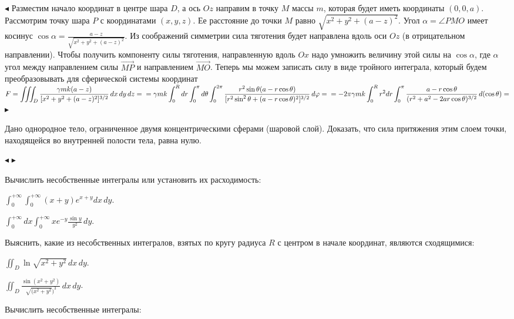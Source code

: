 \documentclass[a5paper,10pt]{article}
\begin{document}
\smallskip\noindent
$\blacktriangleleft$ Разместим начало координат в центре шара $D$, а ось $Oz$ направим в точку $M$
массы $m$, которая будет иметь координаты $(0,0,a)$. Рассмотрим точку шара $P$ с координатами
$(x,y,z)$. Ее расстояние до точки $M$ равно $\sqrt{x^2+y^2+(a-z)^2}$. Угол $\alpha=\angle PMO$
имеет косинус $\displaystyle\cos\alpha=\frac{a-z}{\sqrt{x^2+y^2+(a-z)^2}}$.
Из соображений симметрии сила тяготения будет направлена вдоль оси $Oz$ (в отрицательном
направлении). Чтобы получить компоненту силы тяготения, направленную вдоль $Ox$ надо
умножить величину этой силы на $\cos\alpha$, где $\alpha$ угол между направлением силы
$\overrightarrow{MP}$ и направлением $\overrightarrow{MO}$. Теперь мы можем записать
силу в виде тройного интеграла, который будем преобразовывать для сферической системы
координат\\
$\displaystyle F=\iiint_D\frac{\gamma m k(a-z)}{[x^2+y^2+(a-z)^2]^{3/2}}\,dx\,dy\,dz=\\
=\gamma m k\int_0^R dr\int_0^{\pi} d\theta
\int_0^{2\pi}\frac{r^2\sin\theta(a-r\cos\theta)}{[r^2\sin^2\theta+(a-r\cos\theta)^2]^{3/2}}\,d\varphi=\\
=-2\pi\gamma m k\int_0^Rr^2 dr\int_0^{\pi}
\frac{a-r\cos\theta}{(r^2+a^2-2ar\cos\theta)^{3/2}}\,d(\cos\theta)=$
$\blacktriangleright$

\medskip
{} Дано однородное тело, ограниченное двумя концентрическими
сферами (шаровой слой). Доказать, что сила притяжения этим слоем точки,
находящейся во внутренней полости тела, равна нулю.

\smallskip\noindent
$\blacktriangleleft$ $\blacktriangleright$

\medskip
\noindent Вычислить несобственные интегралы или установить их расходимость:

\medskip
{} $\displaystyle \int_0^{+\infty}\int_0^{+\infty}(x+y)e^{x+y}dx\,dy$.

\medskip
{} $\displaystyle \int_0^{+\infty}dx\int_0^{+\infty}xe^{-y}\frac{\sin y}{y^2}\,dy$.

\medskip
\noindent Выяснить, какие из несобственных интегралов, взятых по кругу 
радиуса $R$ с центром в начале координат, являются сходящимися:

\medskip
{} $\displaystyle\iint_D\ln\sqrt{x^2+y^2}\,dx\,dy$.

\medskip
{} $\displaystyle\iint_D\frac{\sin(x^2+y^2)}{\sqrt{(x^2+y^2})^3}\,dx\,dy$.

\medskip
\noindent Вычислить несобственные интегралы:
\end{document}
